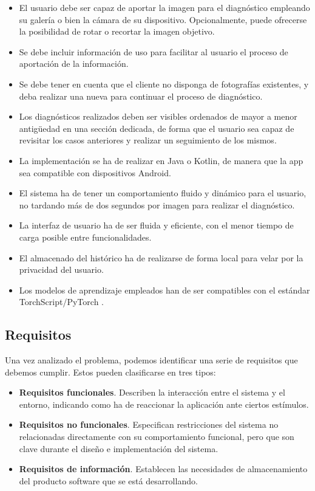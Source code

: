 \begin{itemize}

	\item El usuario debe ser capaz de aportar la imagen para el diagnóstico empleando su galería o bien la cámara de su dispositivo. Opcionalmente, puede ofrecerse la posibilidad de rotar o recortar la imagen objetivo.
	\item Se debe incluir información de uso para facilitar al usuario el proceso de aportación de la información.
	\item Se debe tener en cuenta que el cliente no disponga de fotografías existentes, y deba realizar una nueva para continuar el proceso de diagnóstico.
	\item Los diagnósticos realizados deben ser visibles ordenados de mayor a menor antigüedad en una sección dedicada, de forma que el usuario sea capaz de revisitar los casos anteriores y realizar un seguimiento de los mismos.
	\item La implementación se ha de realizar en Java o Kotlin, de manera que la app sea compatible con dispositivos Android.
	\item El sistema ha de tener un comportamiento fluido y dinámico para el usuario, no tardando más de dos segundos por imagen para realizar el diagnóstico.
	\item La interfaz de usuario ha de ser fluida y eficiente, con el menor tiempo de carga posible entre funcionalidades.
	\item El almacenado del histórico ha de realizarse de forma local para velar por la privacidad del usuario.
	\item Los modelos de aprendizaje empleados han de ser compatibles con el estándar TorchScript/PyTorch \cite{paszke2019pytorch}.
\end{itemize}

\subsection{Requisitos}

Una vez analizado el problema, podemos identificar una serie de requisitos que debemos cumplir. Estos pueden clasificarse en tres tipos:

\begin{itemize}
	\item \textbf{Requisitos funcionales}. Describen la interacción entre el sistema y el entorno, indicando como ha de reaccionar la aplicación ante ciertos estímulos.
	\item \textbf{Requisitos no funcionales}. Especifican restricciones del sistema no relacionadas directamente con su comportamiento funcional, pero que son clave durante el diseño e implementación del sistema.
	\item \textbf{Requisitos de información}. Establecen las necesidades de almacenamiento del producto software que se está desarrollando.
\end{itemize}

